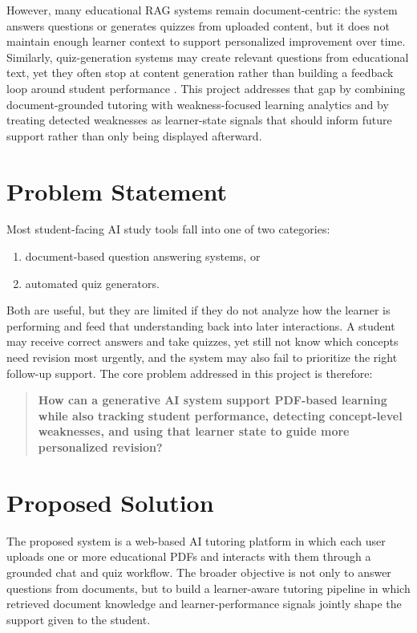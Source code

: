 \documentclass[11pt,a4paper]{article}
\begin{document}
However, many educational RAG systems remain document-centric: the system answers questions or generates quizzes from uploaded content, but it does not maintain enough learner context to support personalized improvement over time. Similarly, quiz-generation systems may create relevant questions from educational text, yet they often stop at content generation rather than building a feedback loop around student performance \cite{bhowmick2023qg,kurulkar2025quizrag}. This project addresses that gap by combining document-grounded tutoring with weakness-focused learning analytics and by treating detected weaknesses as learner-state signals that should inform future support rather than only being displayed afterward.

\section{Problem Statement}
Most student-facing AI study tools fall into one of two categories:

\begin{enumerate}
    \item document-based question answering systems, or
    \item automated quiz generators.
\end{enumerate}

Both are useful, but they are limited if they do not analyze how the learner is performing and feed that understanding back into later interactions. A student may receive correct answers and take quizzes, yet still not know which concepts need revision most urgently, and the system may also fail to prioritize the right follow-up support. The core problem addressed in this project is therefore:

\begin{quote}
\textbf{How can a generative AI system support PDF-based learning while also tracking student performance, detecting concept-level weaknesses, and using that learner state to guide more personalized revision?}
\end{quote}

\section{Proposed Solution}
The proposed system is a web-based AI tutoring platform in which each user uploads one or more educational PDFs and interacts with them through a grounded chat and quiz workflow. The broader objective is not only to answer questions from documents, but to build a learner-aware tutoring pipeline in which retrieved document knowledge and learner-performance signals jointly shape the support given to the student.
\end{document}
